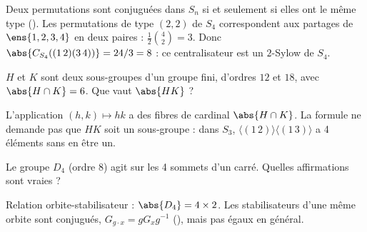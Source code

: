 \begin{qcm}
\begin{question}
\begin{explication}
Deux permutations sont conjuguées dans $S_n$ si et seulement si elles ont le même type (). Les permutations de type $(2,2)$ de $S_4$ correspondent aux partages de $\ens{1,2,3,4}$ en deux paires : $\frac12\binom42=3$. Donc $\abs{C_{S_4}((1\,2)(3\,4))}=24/3=8$ : ce centralisateur est un $2$-Sylow de $S_4$.
\end{explication}
\end{question}
\begin{question}
$H$ et $K$ sont deux sous-groupes d'un groupe fini, d'ordres $12$ et $18$, avec $\abs{H\cap K}=6$. Que vaut $\abs{HK}$ ?
\begin{explication}
L'application $(h,k)\mapsto hk$ a des fibres de cardinal $\abs{H\cap K}$. La formule ne demande pas que $HK$ soit un sous-groupe : dans $S_3$, $\langle(1\,2)\rangle\langle(1\,3)\rangle$ a 4 éléments sans en être un.
\end{explication}
\end{question}
\begin{question}[plusieurs]
Le groupe $D_4$ (ordre 8) agit sur les 4 sommets d'un carré. Quelles affirmations sont vraies ?
\begin{explication}
Relation orbite-stabilisateur : $\abs{D_4}=4\times2$. Les stabilisateurs d'une même orbite sont conjugués, $G_{g\cdot x}=gG_xg^{-1}$ (), mais pas égaux en général.
\end{explication}
\end{question}
\begin{question}

\end{question}
\end{qcm}
